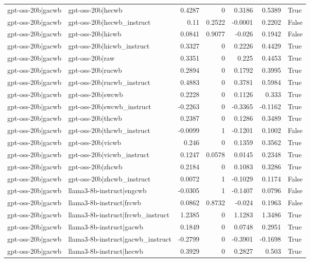 \begin{table}
\begin{tabular}{l l r r r r l}
gpt-oss-20b|gacwb & gpt-oss-20b|hecwb & 0.4287 & 0 & 0.3186 & 0.5389 & True \\
gpt-oss-20b|gacwb & gpt-oss-20b|hecwb_instruct & 0.11 & 0.2522 & -0.0001 & 0.2202 & False \\
gpt-oss-20b|gacwb & gpt-oss-20b|hicwb & 0.0841 & 0.9077 & -0.026 & 0.1942 & False \\
gpt-oss-20b|gacwb & gpt-oss-20b|hicwb_instruct & 0.3327 & 0 & 0.2226 & 0.4429 & True \\
gpt-oss-20b|gacwb & gpt-oss-20b|raw & 0.3351 & 0 & 0.225 & 0.4453 & True \\
gpt-oss-20b|gacwb & gpt-oss-20b|rucwb & 0.2894 & 0 & 0.1792 & 0.3995 & True \\
gpt-oss-20b|gacwb & gpt-oss-20b|rucwb_instruct & 0.4883 & 0 & 0.3781 & 0.5984 & True \\
gpt-oss-20b|gacwb & gpt-oss-20b|swcwb & 0.2228 & 0 & 0.1126 & 0.333 & True \\
gpt-oss-20b|gacwb & gpt-oss-20b|swcwb_instruct & -0.2263 & 0 & -0.3365 & -0.1162 & True \\
gpt-oss-20b|gacwb & gpt-oss-20b|thcwb & 0.2387 & 0 & 0.1286 & 0.3489 & True \\
gpt-oss-20b|gacwb & gpt-oss-20b|thcwb_instruct & -0.0099 & 1 & -0.1201 & 0.1002 & False \\
gpt-oss-20b|gacwb & gpt-oss-20b|vicwb & 0.246 & 0 & 0.1359 & 0.3562 & True \\
gpt-oss-20b|gacwb & gpt-oss-20b|vicwb_instruct & 0.1247 & 0.0578 & 0.0145 & 0.2348 & True \\
gpt-oss-20b|gacwb & gpt-oss-20b|zhcwb & 0.2184 & 0 & 0.1083 & 0.3286 & True \\
gpt-oss-20b|gacwb & gpt-oss-20b|zhcwb_instruct & 0.0072 & 1 & -0.1029 & 0.1174 & False \\
gpt-oss-20b|gacwb & llama3-8b-instruct|engcwb & -0.0305 & 1 & -0.1407 & 0.0796 & False \\
gpt-oss-20b|gacwb & llama3-8b-instruct|frcwb & 0.0862 & 0.8732 & -0.024 & 0.1963 & False \\
gpt-oss-20b|gacwb & llama3-8b-instruct|frcwb_instruct & 1.2385 & 0 & 1.1283 & 1.3486 & True \\
gpt-oss-20b|gacwb & llama3-8b-instruct|gacwb & 0.1849 & 0 & 0.0748 & 0.2951 & True \\
gpt-oss-20b|gacwb & llama3-8b-instruct|gacwb_instruct & -0.2799 & 0 & -0.3901 & -0.1698 & True \\
gpt-oss-20b|gacwb & llama3-8b-instruct|hecwb & 0.3929 & 0 & 0.2827 & 0.503 & True \\

\end{tabular}
\end{table}
